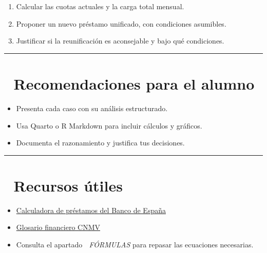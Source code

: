\documentclass[
  letterpaper,
  DIV=11,
  numbers=noendperiod]{scrreprt}
\providecommand{\tightlist}{%
  \setlength{\itemsep}{0pt}\setlength{\parskip}{0pt}}\usepackage{longtable,booktabs,array}
\begin{document}
\begin{tcolorbox}
\begin{enumerate}
\def\labelenumi{\arabic{enumi}.}
\tightlist
\item
  Calcular las cuotas actuales y la carga total mensual.
\item
  Proponer un nuevo préstamo unificado, con condiciones asumibles.
\item
  Justificar si la reunificación es aconsejable y bajo qué condiciones.
\end{enumerate}

\begin{center}\rule{0.5\linewidth}{0.5pt}\end{center}

\section{📝 Recomendaciones para el
alumno}\label{recomendaciones-para-el-alumno}

\begin{tcolorbox}[enhanced jigsaw, toprule=.15mm, left=2mm, breakable, opacitybacktitle=0.6, toptitle=1mm, coltitle=black, arc=.35mm, leftrule=.75mm, bottomtitle=1mm, titlerule=0mm, title=\textcolor{quarto-callout-tip-color}{\faLightbulb}\hspace{0.5em}{¿Cómo abordar los casos?}, rightrule=.15mm, opacityback=0, bottomrule=.15mm, colback=white, colframe=quarto-callout-tip-color-frame, colbacktitle=quarto-callout-tip-color!10!white]

\begin{itemize}
\tightlist
\item
  Presenta cada caso con su análisis estructurado.
\item
  Usa Quarto o R Markdown para incluir cálculos y gráficos.
\item
  Documenta el razonamiento y justifica tus decisiones.
\end{itemize}

\end{tcolorbox}

\begin{center}\rule{0.5\linewidth}{0.5pt}\end{center}

\section{📎 Recursos útiles}\label{recursos-uxfatiles}

\begin{itemize}
\tightlist
\item
  \href{https://clientebancario.bde.es/pcb/es/}{Calculadora de préstamos
  del Banco de España}
\item
  \href{https://www.cnmv.es/portal/Glossary.aspx}{Glosario financiero
  CNMV}
\item
  Consulta el apartado 📐 \emph{FÓRMULAS} para repasar las ecuaciones
  necesarias.
\end{itemize}


\end{tcolorbox}
\end{document}

